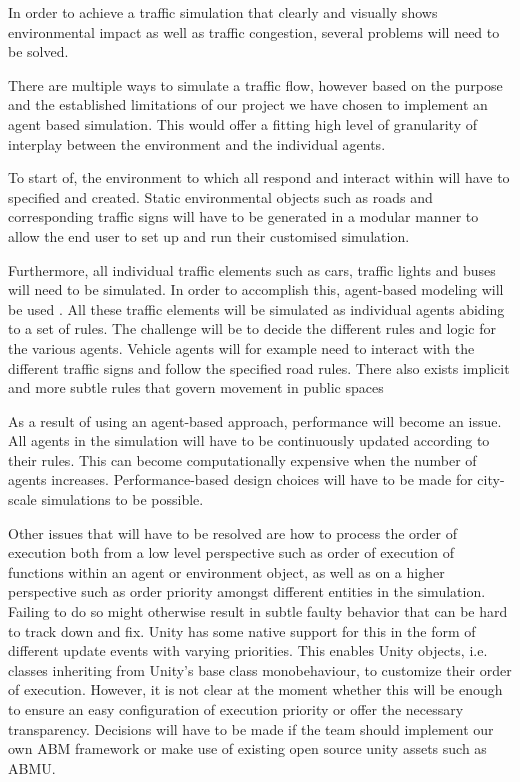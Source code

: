 In order to achieve a traffic simulation that clearly and visually shows environmental impact as well as traffic congestion, several problems will need to be solved.

There are multiple ways to simulate a traffic flow, however based on the purpose and the established limitations of our project we have chosen to implement an agent based simulation. This would offer a fitting high level of granularity of interplay between the environment and the individual agents. 

To start of, the environment to which all  respond and interact within will have to specified and created. Static environmental objects such as roads and corresponding traffic signs will have to be generated in a modular manner to allow the end user to set up and run their customised simulation.

Furthermore, all individual traffic elements such as cars, traffic lights and buses will need to be simulated. In order to accomplish this, agent-based modeling will be used \cite{agent-based-modeling}. All these traffic elements will be simulated as individual agents  abiding to a set of rules. The challenge will be to decide the different rules and logic for the various agents. Vehicle agents will for example need to interact with the different traffic signs and follow the specified road rules.
There also exists implicit and more subtle rules that govern movement in public spaces

As a result of using an agent-based approach, performance will become an issue. All agents in the simulation will have to be continuously updated according to their rules. This can become computationally expensive when the number of agents increases. Performance-based design choices will have to be made for city-scale simulations to be possible.

Other issues that will have to be resolved are how to process the order of execution both from a low level perspective such as order of execution of functions within an agent or environment object, as well as on a higher perspective such as order priority amongst different entities in the simulation. Failing to do so might otherwise result in subtle faulty behavior that can be hard to track down and fix. Unity has some native support for this in the form of different update events with varying priorities. This enables Unity objects, i.e. classes inheriting from Unity's base class monobehaviour, to customize their order of execution. However, it is not clear at the moment whether this will be enough to ensure an easy configuration of execution priority or offer the necessary transparency. Decisions will have to be made if the team should implement our own ABM framework or make use of existing open source unity assets such as ABMU.

